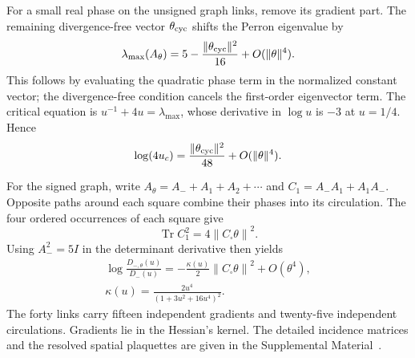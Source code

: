 \documentclass[aps,prx,reprint,longbibliography]{revtex4-2}
\providecommand{\Tr}{\operatorname{Tr}}
\providecommand{\SI}{Supplemental Material}
\providecommand{\norm}[1]{\left\lVert#1\right\rVert}
\begin{document}
For a small real phase on the unsigned graph links, remove its gradient part. The remaining divergence-free vector $\theta_{\rm cyc}$ shifts the Perron eigenvalue by
\begin{equation}
 \lambda_{\max}(A_\theta)=5-\frac{\|\theta_{\rm cyc}\|^2}{16}
 +O(\|\theta\|^4).
 \label{ap:circulationperron}
\end{equation}
This follows by evaluating the quadratic phase term in the normalized constant vector; the divergence-free condition cancels the first-order eigenvector term. The critical equation is $u^{-1}+4u=\lambda_{\max}$, whose derivative in $\log u$ is $-3$ at $u=1/4$. Hence
\begin{equation}
 \log(4u_c)=\frac{\|\theta_{\rm cyc}\|^2}{48}+O(\|\theta\|^4).
 \label{ap:circulation48}
\end{equation}

For the signed graph, write $A_\theta=A_-+A_1+A_2+\cdots$ and $C_1=A_-A_1+A_1A_-$. Opposite paths around each square combine their phases into its circulation. The four ordered occurrences of each square give
\begin{equation}
 \Tr C_1^2=4\norm{C_\square\theta}^2.
 \label{ap:hessiantrace}
\end{equation}
Using $A_-^2=5I$ in the determinant derivative then yields
\begin{equation}
 \begin{gathered}
 \log\frac{D_{-,\theta}(u)}{D_-(u)}
 =-\frac{\kappa(u)}2\norm{C_\square\theta}^2+O(\theta^4),\\
 \kappa(u)=\frac{2u^4}{(1+3u^2+16u^4)^2}.
 \end{gathered}
 \label{ap:curvaturehessian}
\end{equation}
The forty links carry fifteen independent gradients and twenty-five independent circulations. Gradients lie in the Hessian's kernel. The detailed incidence matrices and the resolved spatial plaquettes are given in the \SI~\cite{SI}.
\end{document}
